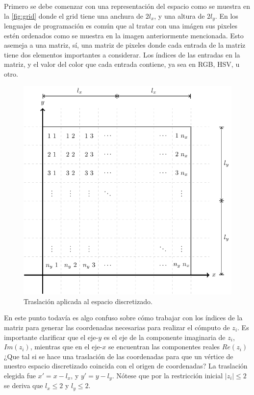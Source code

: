 Primero se debe comenzar con una representación del espacio como se muestra en la \cref{fig:grid} donde el grid tiene una anchura de $2 l_x$, y una altura de $2 l_y$. En los lenguajes de programación es común que al tratar con una imágen sus pixeles estén ordenados como se muestra en la imagen anteriormente mencionada. Esto asemeja a una matriz, sí, una matriz de pixeles donde cada entrada de la matriz tiene dos elementos importantes a considerar. Los índices de las entradas en la matriz, y el valor del color que cada entrada contiene, ya sea en RGB, HSV, u otro.

\begin{figure}[ht!]
    \centering
    \includegraphics[scale=0.8]{../figures/grid-translated/grid-translated}
    \caption{Traslación aplicada al espacio discretizado.}
    \label{fig:grid-moved}
\end{figure}

En este punto todavía es algo confuso sobre cómo trabajar con los índices de la matriz para generar las coordenadas necesarias para realizar el cómputo de $z_i$. Es importante clarificar que el eje-$y$ es el eje de la componente imaginaria de $z_i$, $Im(z_i)$, mientras que en el eje-$x$ se encuentran las componentes reales $Re(z_i)$ ¿Que tal si se hace una traslación de las coordenadas para que un vértice de nuestro espacio discretizado coincida con el origen de coordenadas? La traslación elegida fue $x' = x - l_x$, y $y' = y - l_y$. Nótese que por la restricción inicial $|z_i| \leq 2$ se deriva que $l_x \leq 2$ y $l_y \leq 2$.

